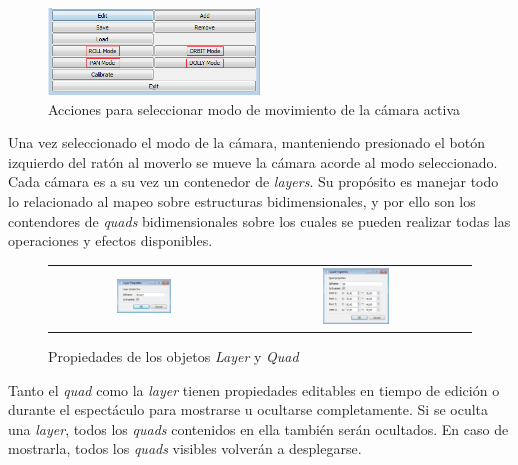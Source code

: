 \begin{figure}[H]
  \centering
    \includegraphics[width=0.5\textwidth]{./Cap5_vmt/vmt_SceneBotonera.png}
  \caption{Acciones para seleccionar modo de movimiento de la cámara activa}
  \label{fig:VMT-CameraActions}
\end{figure}

Una vez seleccionado el modo de la cámara, manteniendo presionado el botón izquierdo del ratón al moverlo se mueve la cámara acorde al modo seleccionado.
Cada cámara es a su vez un contenedor de \emph{layers}. Su propósito es manejar todo lo relacionado al mapeo sobre estructuras bidimensionales, y por ello son los contendores de \emph{quads} bidimensionales sobre los cuales se pueden realizar todas las operaciones y efectos disponibles.

\begin{figure}
	\begin{center}
		\begin{tabular}[c]{cc}
			\includegraphics[width=0.3\textwidth]{./Cap5_vmt/vmt_layerProperties.png}
				&        
			\includegraphics[width=0.3\textwidth]{./Cap5_vmt/vmt_quadProperties.png}
		\end{tabular}
	\end{center}
	\caption{Propiedades de los objetos \emph{Layer} y \emph{Quad}}
	\label{fig:VMT-LayerQuadProperties}
\end{figure}

Tanto el \emph{quad} como la \emph{layer} tienen propiedades editables en tiempo de edición o durante el espectáculo para mostrarse u ocultarse completamente. Si se oculta una \emph{layer}, todos los \emph{quads} contenidos en ella también serán ocultados. En caso de mostrarla, todos los \emph{quads} visibles volverán a desplegarse.


